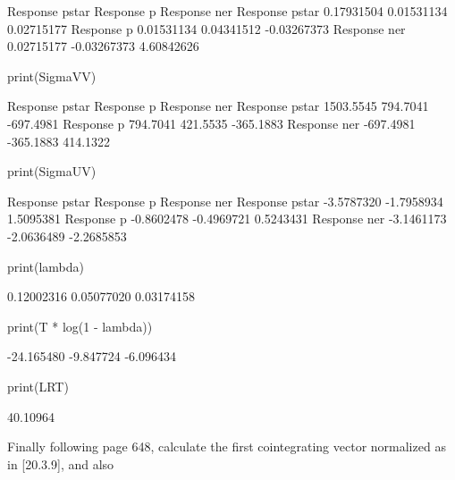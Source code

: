 \documentclass[a4paper]{article}
\begin{document}
\begin{Schunk}
\begin{Soutput}
               Response pstar  Response p Response ner
Response pstar     0.17931504  0.01531134   0.02715177
Response p         0.01531134  0.04341512  -0.03267373
Response ner       0.02715177 -0.03267373   4.60842626
\end{Soutput}
\begin{Sinput}
 print(SigmaVV)
\end{Sinput}
\begin{Soutput}
               Response pstar Response p Response ner
Response pstar      1503.5545   794.7041    -697.4981
Response p           794.7041   421.5535    -365.1883
Response ner        -697.4981  -365.1883     414.1322
\end{Soutput}
\begin{Sinput}
 print(SigmaUV)
\end{Sinput}
\begin{Soutput}
               Response pstar Response p Response ner
Response pstar     -3.5787320 -1.7958934    1.5095381
Response p         -0.8602478 -0.4969721    0.5243431
Response ner       -3.1461173 -2.0636489   -2.2685853
\end{Soutput}
\begin{Sinput}
 print(lambda)
\end{Sinput}
\begin{Soutput}
[1] 0.12002316 0.05077020 0.03174158
\end{Soutput}
\begin{Sinput}
 print(T * log(1 - lambda))
\end{Sinput}
\begin{Soutput}
[1] -24.165480  -9.847724  -6.096434
\end{Soutput}
\begin{Sinput}
 print(LRT)
\end{Sinput}
\begin{Soutput}
[1] 40.10964
\end{Soutput}
\end{Schunk}
Finally following page 648, calculate the first cointegrating vector normalized as in [20.3.9], and also
\end{document}
